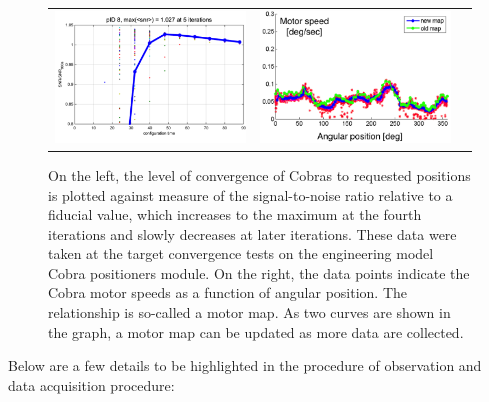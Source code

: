 \documentclass[a4paper]{article}
\begin{document}
\begin{figure}
  \begin{center}
    \begin{tabular}{ccc} %
      \includegraphics[width=7.5cm]{./figures/cobra-sn.png} &
      \includegraphics[width=7.5cm]{./figures/cobra-motormap.png} \\
    \end{tabular}
  \end{center}
  \caption{ \label{fig:cobraperformance} On the left, the level of
    convergence of Cobras to requested positions is plotted against
    measure of the signal-to-noise ratio relative to a fiducial value,
    which increases to the maximum at the fourth iterations and slowly
    decreases at later iterations. These data were taken at the target
    convergence tests on the engineering model Cobra positioners
    module. On the right, the data points indicate the Cobra motor
    speeds as a function of angular position. The relationship is
    so-called a motor map. As two curves are shown in the graph, a
    motor map can be updated as more data are collected.}
\end{figure}

Below are a few details to be highlighted in the procedure of
observation and data acquisition procedure:
\end{document}
